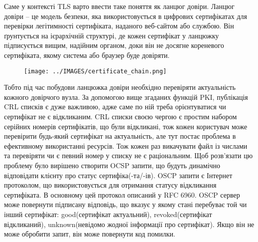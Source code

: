 Саме у контексті TLS варто ввести таке поняття як ланцюг довіри. Ланцюг довіри – це модель безпеки, яка використовується в цифрових сертифікатах для перевірки легітимності сертифіката, наданого веб-сайтом або службою. Він ґрунтується на ієрархічній структурі, де кожен сертифікат у ланцюжку підписується вищим, надійним органом, доки він не досягне кореневого сертифіката, якому система або браузер буде довіряти.
\begin{figure}[ht]
        \centering
        \texttt{[image: ../IMAGES/certificate\_chain.png]}
        \label{certificate_chain}
\end{figure}
Тобто під час побудови ланцюжка довіри необхідно перевіряти актуальність кожного довірчого вузла. За допомогою вище згаданих функцій PKI, публікація CRL списків є дуже важливою, адже саме по ній треба орієнтуватися чи сертифікат не є відкликаним. CRL списки своєю чергою є простим набором серійних номерів сертифікатів, що були відкликані, тож кожен користувач може перевірити будь-який сертифікат на актуальність, але тут постає проблема в ефективному використанні ресурсів. Тож кожен раз викачувати файл із числами та перевіряти чи є певний номер у списку не є раціональним. Щоб розв'язати цю проблему було вирішено створити OCSP запити, що будуть динамічно відповідати клієнту про статус сертифіка(-та/-ів).
OSCP запити є Інтернет протоколом, що використовується для отримання статусу відкликання сертифіката. В основному цей протокол описаний у RFC 6960. OSCP сервер може повернути підписану відповідь, що вказує у якому стані перебуває той чи інший сертифікат: good(сертифікат актуальний), revoked(сертифікат відкликаний), unknown(невідомо жодної інформації про сертифікат). Якщо він не може обробити запит, він може повернути код помилки.
